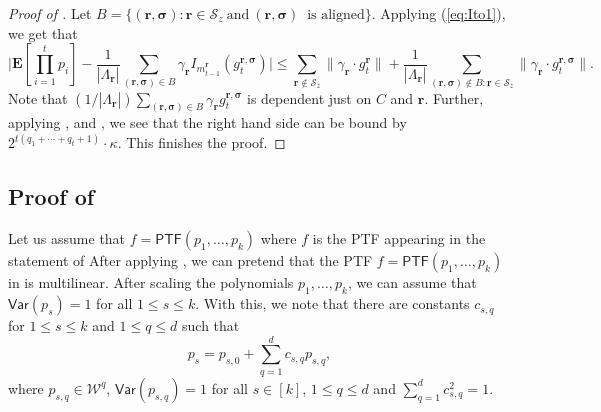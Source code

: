 \documentclass{toc}
\begin{document}
\begin{proof}[Proof of ]
Let $B = \{(\mathbf{r}, \boldsymbol{\sigma}): \mathbf{r} \in \mathcal{S}_z \ \textrm{and} \ (\mathbf{r}, \boldsymbol{\sigma}) \ \textrm{ is aligned}\}$.
Applying (\ref{eq:Ito1}), we get that
\[
    \bigg| \mathbf{E}[\prod_{i=1}^t p_i] - \frac{1}{|\Lambda_{\mathbf{r}}|}\sum_{(\mathbf{r}, \boldsymbol{\sigma}) \in B} \gamma_{\mathbf{r}} I_{m_{t-1}^{\mathbf{r}}}(g^{\mathbf{r}, \boldsymbol{\sigma}}_{t})\bigg| \leq
\sum_{\mathbf{r} \not \in \mathcal{S}_z} \|\gamma_{\mathbf{r}} \cdot
g^{\mathbf{r}}_{t} \| +  \frac{1}{|\Lambda_{\mathbf{r}}|}\sum_{(\mathbf{r},
\boldsymbol{\sigma}) \not \in B :\mathbf{r} \in \mathcal{S}_z}
\|\gamma_{\mathbf{r}} \cdot g^{\mathbf{r}, \boldsymbol{\sigma}}_{t} \|.
\]
Note that $({1}/{|\Lambda_{\mathbf{r}}|}) \sum_{(\mathbf{r}, \boldsymbol{\sigma}) \in B} \gamma_{\mathbf{r}} g^{\mathbf{r}, \boldsymbol{\sigma}}_{t}$ is dependent just on $C$ and $\mathbf{r}$. Further, applying ,  and , we see that the right hand side can be bound by
$2^{t(q_1 + \cdots + q_t +1)} \cdot \kappa$. This finishes the proof. 
\end{proof}


\subsection{Proof of }
Let us assume that $f= \mathsf{PTF}(p_1, \ldots, p_k)$ 
where $f$ is the PTF appearing in the statement of 
After applying , we can pretend that the PTF $f =  \mathsf{PTF}(p_1, \ldots, p_k)$ in  is multilinear. 
After scaling the polynomials $p_1, \ldots, p_k$,  we can assume that $\mathsf{Var}(p_s)=1$ for all $1 \le s \le k$. With this, we note that there are constants $c_{s,q}$ for $1 \le s \le k$ and $1 \le q \le d$ such that 
\[
p_{s} = p_{s,0} + \sum_{q=1}^d c_{s,q} p_{s,q}, 
\]
where $p_{s,q} \in \mathcal{W}^q$, $\mathsf{Var}(p_{s,q}) =1$ for all $s \in [k]$, $1 \le q \le d$ and $\sum_{q=1}^d c_{s,q}^2=1$. 
\end{document}
